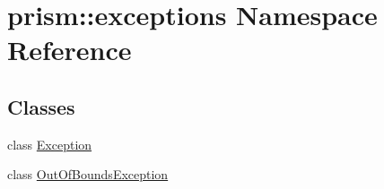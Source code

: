 \hypertarget{namespaceprism_1_1exceptions}{}\section{prism\+:\+:exceptions Namespace Reference}
\label{namespaceprism_1_1exceptions}
\subsection*{Classes}
\begin{DoxyCompactItemize}
\item 
class \hyperlink{classprism_1_1exceptions_1_1_exception}{Exception}
\item 
class \hyperlink{classprism_1_1exceptions_1_1_out_of_bounds_exception}{Out\+Of\+Bounds\+Exception}
\end{DoxyCompactItemize}
